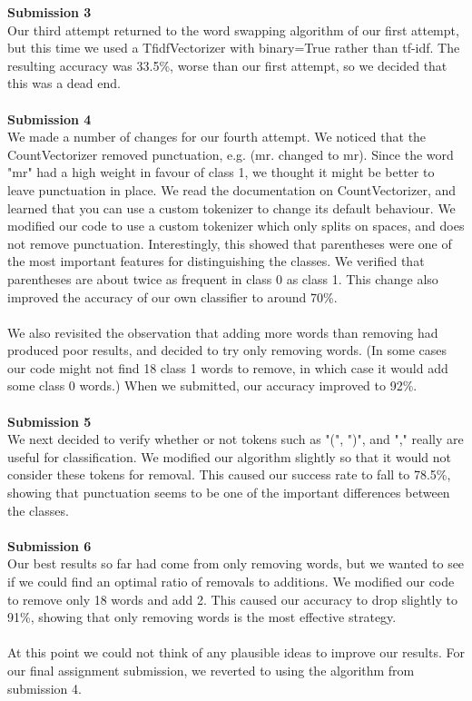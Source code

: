 \documentclass{article}
\begin{document}
\textbf{\large Submission 3} \\
Our third attempt returned to the word swapping algorithm of our first attempt, but this time we used a TfidfVectorizer with binary=True rather than tf-idf. The resulting accuracy was 33.5\%, worse than our first attempt, so we decided that this was a dead end.\\
\\
\textbf{\large Submission 4} \\
We made a number of changes for our fourth attempt. We noticed that the CountVectorizer removed punctuation, e.g. (mr. changed to mr). Since the word "mr" had a high weight in favour of class 1, we thought it might be better to leave punctuation in place. We read the documentation on CountVectorizer, and learned that you can use a custom tokenizer to change its default behaviour. We modified our code to use a custom tokenizer which only splits on spaces, and does not remove punctuation. Interestingly, this showed that parentheses were one of the most important features for distinguishing the classes. We verified that parentheses are about twice as frequent in class 0 as class 1. This change also improved the accuracy of our own classifier to around 70\%. \\
\\
We also revisited the observation that adding more words than removing had produced poor results, and decided to try only removing words. (In some cases our code might not find 18 class 1 words to remove, in which case it would add some class 0 words.) When we submitted, our accuracy improved to 92\%. \\
\\
\textbf{\large Submission 5} \\
We next decided to verify whether or not tokens such as "(", ")", and "," really are useful for classification. We modified our algorithm slightly so that it would not consider these tokens for removal. This caused our success rate to fall to 78.5\%, showing that punctuation seems to be one of the important differences between the classes. \\
\\
\textbf{\large Submission 6} \\
Our best results so far had come from only removing words, but we wanted to see if we could find an optimal ratio of removals to additions. We modified our code to remove only 18 words and add 2. This caused our accuracy to drop slightly to 91\%, showing that only removing words is the most effective strategy. \\
\\
At this point we could not think of any plausible ideas to improve our results. For our final assignment submission, we reverted to using the algorithm from submission 4.

\end{document}
